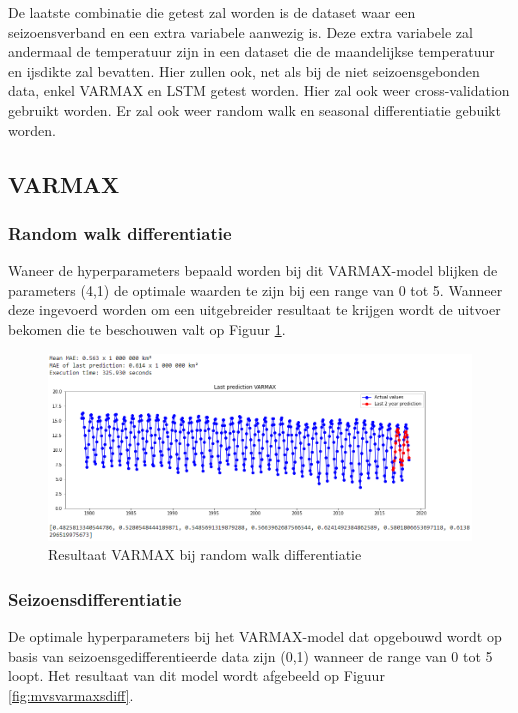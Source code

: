De laatste combinatie die getest zal worden is de dataset waar een seizoensverband en een extra variabele aanwezig is. Deze extra variabele zal andermaal de temperatuur zijn in een dataset die de maandelijkse temperatuur en ijsdikte zal bevatten. Hier zullen ook, net als bij de niet seizoensgebonden data, enkel VARMAX en LSTM getest worden. Hier zal ook weer cross-validation gebruikt worden. Er zal ook weer random walk en seasonal differentiatie gebuikt worden.

\subsection{VARMAX}
\subsubsection{Random walk differentiatie}

Waneer de hyperparameters bepaald worden bij dit VARMAX-model blijken de parameters (4,1) de optimale waarden te zijn bij een range van 0 tot 5. Wanneer deze ingevoerd worden om een uitgebreider resultaat te krijgen wordt de uitvoer bekomen die te beschouwen valt op Figuur \ref{fig:mvsvarmaxdiff}.

\begin{figure}[!h]
    \centering
    \caption{Resultaat VARMAX bij random walk differentiatie}
    \label{fig:mvsvarmaxdiff}
    \includegraphics[width=1\linewidth]{mv_s_varmax_diff}
\end{figure}


\subsubsection{Seizoensdifferentiatie}
De optimale hyperparameters bij het VARMAX-model dat opgebouwd wordt op basis van seizoensgedifferentieerde data zijn (0,1) wanneer de range van 0 tot 5 loopt. Het resultaat van dit model wordt afgebeeld op Figuur \ref{fig:mvsvarmaxsdiff}.


